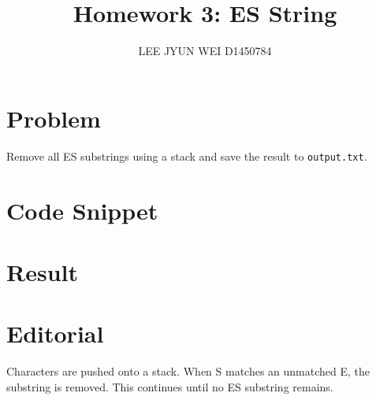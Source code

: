 \documentclass[12pt, a4paper]{article}
\title{Homework 3: ES String}
\author{LEE JYUN WEI \hspace{0.1pt} D1450784}
\date{}
\begin{document}
\maketitle

\section{Problem}

Remove all ES substrings using a stack and save
the result to \texttt{output.txt}.

\section{Code Snippet}



\section{Result}



\section{Editorial}

Characters are pushed onto a stack. When S matches
an unmatched E, the substring is removed.
This continues until no ES substring remains.
\end{document}
